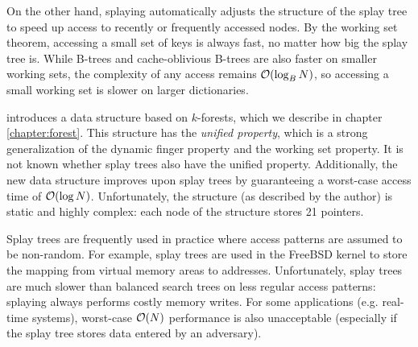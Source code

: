 On the other hand, splaying automatically adjusts the structure of the splay
tree to speed up access to recently or frequently accessed nodes. By the
working set theorem, accessing a small set of keys is always fast, no matter
how big the splay tree is. While B-trees and cache-oblivious B-trees are
also faster on smaller working sets, the complexity of any access remains
$\mathcal{O}(\log_B N)$, so accessing a small working set is slower on larger
dictionaries.

\cite{alternatives-to-splay-trees} introduces a data structure based
on $k$-forests, which we describe in chapter \ref{chapter:forest}.
This structure has the \textit{unified property}, which is a strong
generalization of the dynamic finger property and the working set property.
It is not known whether splay trees also have the unified property.
Additionally, the new data structure improves upon splay trees by guaranteeing
a worst-case access time of $\mathcal{O}(\log N)$. Unfortunately, the structure
(as described by the author) is static and highly complex: each node of
the structure stores 21 pointers.

Splay trees are frequently used in practice where access patterns are assumed
to be non-random. For example, splay trees are used in the FreeBSD kernel
to store the mapping from virtual memory areas to
addresses\cite{freebsd-vm-splay}. %
Unfortunately, splay trees are much slower than balanced search trees on less
regular access patterns: splaying always performs costly memory writes.
For some applications (e.g. real-time systems), worst-case $\mathcal{O}(N)$ performance
is also unacceptable (especially if the splay tree stores data entered by
an adversary).
